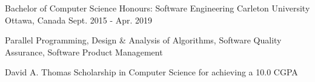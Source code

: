 
\begin{cventries}
	\cventry
		{Bachelor of Computer Science Honours: Software Engineering}
		{Carleton University}
		{Ottawa, Canada}
		{Sept. 2015 - Apr. 2019}
		{\begin{cvitems}
			\item Parallel Programming, Design \& Analysis of Algorithms, Software Quality Assurance, Software Product Management
			\item David A. Thomas Scholarship in Computer Science for achieving a 10.0 CGPA
		\end{cvitems}}
\end{cventries}